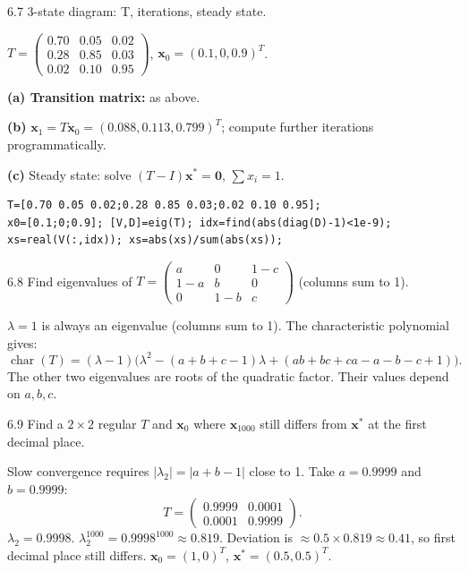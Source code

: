 \begin{exercise}{6.7}
3-state diagram: T, iterations, steady state.
\end{exercise}
\begin{solution}
$T=\begin{pmatrix}0.70&0.05&0.02\\0.28&0.85&0.03\\0.02&0.10&0.95\end{pmatrix}$, $\mathbf{x}_0=(0.1,0,0.9)^T$.

\textbf{(a) Transition matrix:} as above.

\textbf{(b)} $\mathbf{x}_1=T\mathbf{x}_0=(0.088,0.113,0.799)^T$; compute further iterations programmatically.

\textbf{(c)} Steady state: solve $(T-I)\mathbf{x}^*=\mathbf{0}$, $\sum x_i=1$.
\begin{lstlisting}
T=[0.70 0.05 0.02;0.28 0.85 0.03;0.02 0.10 0.95];
x0=[0.1;0;0.9]; [V,D]=eig(T); idx=find(abs(diag(D)-1)<1e-9);
xs=real(V(:,idx)); xs=abs(xs)/sum(abs(xs));
\end{lstlisting}
\end{solution}

\begin{exercise}{6.8}
Find eigenvalues of $T=\begin{pmatrix}a&0&1-c\\1-a&b&0\\0&1-b&c\end{pmatrix}$ (columns sum to 1).
\end{exercise}
\begin{solution}
$\lambda=1$ is always an eigenvalue (columns sum to 1). The characteristic polynomial gives:
\[
\operatorname{char}(T) = (\lambda-1)\bigl(\lambda^2 - (a+b+c-1)\lambda + (ab+bc+ca-a-b-c+1)\bigr).
\]
The other two eigenvalues are roots of the quadratic factor. Their values depend on $a,b,c$.
\end{solution}

\begin{exercise}{6.9}
Find a $2\times2$ regular $T$ and $\mathbf{x}_0$ where $\mathbf{x}_{1000}$ still differs from $\mathbf{x}^*$ at the first decimal place.
\end{exercise}
\begin{solution}
Slow convergence requires $|\lambda_2|=|a+b-1|$ close to 1. Take $a=0.9999$ and $b=0.9999$:
\[T=\begin{pmatrix}0.9999&0.0001\\0.0001&0.9999\end{pmatrix}.\]
$\lambda_2=0.9998$. $\lambda_2^{1000}=0.9998^{1000}\approx0.819$. Deviation is $\approx0.5\times0.819\approx0.41$, so first decimal place still differs. $\mathbf{x}_0=(1,0)^T$, $\mathbf{x}^*=(0.5,0.5)^T$.
\end{solution}

